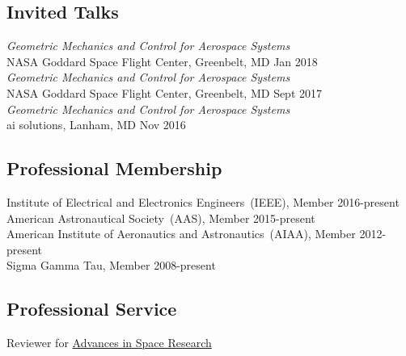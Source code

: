 
\subsection*{Invited Talks}
{}
\textit{Geometric Mechanics and Control for Aerospace Systems} \\NASA Goddard Space Flight Center, Greenbelt, MD \hfill {Jan 2018}\\
\textit{Geometric Mechanics and Control for Aerospace Systems} \\NASA Goddard Space Flight Center, Greenbelt, MD \hfill {Sept 2017}\\
\textit{Geometric Mechanics and Control for Aerospace Systems} \\ai solutions, Lanham, MD \hfill {Nov 2016}

\subsection*{Professional Membership}
{}
Institute of Electrical and Electronics Engineers~(IEEE), Member \hfill {2016-present} \\
American Astronautical Society~(AAS), Member \hfill {2015-present} \\
American Institute of Aeronautics and Astronautics~(AIAA), Member \hfill {2012-present} \\
Sigma Gamma Tau, Member \hfill  {2008-present} \\

\subsection*{Professional Service}
Reviewer for \href{http://www.journals.elsevier.com/advances-in-space-research/}{Advances in Space Research}
